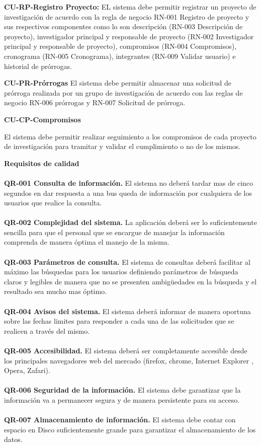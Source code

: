 \documentclass[12pt,oneside,letterpaper]{report}
\begin{document}
\textbf{CU-RP-Registro Proyecto:}
EL sistema debe permitir registrar un proyecto de investigación  de acuerdo con la regla de negocio RN-001 Registro de proyecto y sus respectivos componentes como lo son descripción (RN-003 Descripción de proyecto), investigador principal y responsable de proyecto  (RN-002 Investigador principal y responsable de proyecto), compromisos (RN-004 Compromisos), cronograma (RN-005 Cronograma), integrantes (RN-009 Validar usuario) e historial de prórrogas.


\textbf{CU-PR-Prórrogas}
El sistema debe permitir almacenar una solicitud de prórroga realizada por un grupo de investigación de acuerdo con las reglas de negocio  RN-006 prórrogas y RN-007 Solicitud de prórroga.


\textbf{CU-CP-Compromisos}

El sistema debe permitir realizar seguimiento a los compromisos de cada proyecto de investigación para tramitar y validar el cumplimiento o no de los mismos.


\textbf{Requisitos de calidad}\\
\\
\textbf{QR-001 Consulta de información.} El sistema no deberá tardar mas de cinco segundos en dar respuesta a una bus queda de información por cualquiera de los usuarios que realice la consulta.\\
\\
\textbf{QR-002 Complejidad del sistema.} La aplicación deberá ser lo suficientemente sencilla para que el personal que se encargue de manejar la información comprenda de manera óptima el manejo de la misma.\\
\\
\textbf{QR-003 Parámetros de consulta.} El sistema de consultas deberá facilitar al máximo las búsquedas para los usuarios definiendo parámetros de búsqueda claros y legibles de manera que no se presenten ambigüedades en la búsqueda y el resultado sea mucho mas óptimo.\\
\\
\textbf{QR-004 Avisos del sistema.} El sistema deberá informar de manera oportuna sobre las fechas limites para responder a cada una de las solicitudes que se realicen a través del mismo.\\
\\
\textbf{QR-005 Accesibilidad.} El sistema deberá ser completamente accesible desde los principales navegadores web del mercado (firefox, chrome, Internet Explorer , Opera, Zafari).\\
\\
\textbf{QR-006 Seguridad de la información.} El sistema debe garantizar que la información va a permanecer segura y de manera persistente para su acceso.\\
\\
\textbf{QR-007 Almacenamiento de información.} El sistema debe contar con espacio en Disco suficientemente grande para garantizar el almacenamiento de los datos.\\
\\
\end{document}
